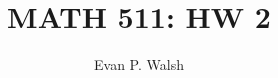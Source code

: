 \documentclass[12pt]{article}
\title{MATH 511: HW 2}
\author{Evan P. Walsh}
\begin{document}


\def\IC{{\bf C}}
\def\({\left (}
\def\){\right )}
\def\zb{\overline z}
\def\dP{\partial}
\end{document}
